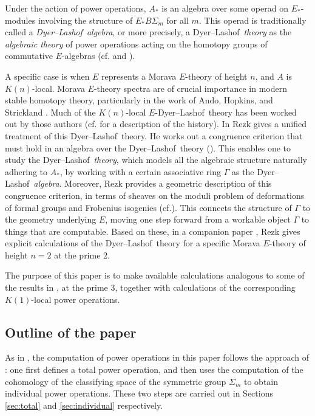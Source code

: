 \documentclass{gtpart}
\theoremstyle{definition}
\theoremstyle{remark}
\newcommand{\cf}{cf.\thinspace}
\newcommand{\DL}{Dyer--Lashof~}
\newcommand{\G}{\Gamma}
\begin{document}
Under the action of power operations, $A_*$ is an algebra over some operad on $E_*$-modules involving the structure of $E_* B\Sigma_m$ for all $m$.  
This operad is traditionally called a {\em \DL algebra}, or more precisely, 
a \DL {\em theory} as the {\em algebraic theory} of power operations acting on the homotopy groups of commutative $E$-algebras 
(\cf \cite[Chapters III, VIII, and IX]{H_infty} and \cite[Section 9]{lpo}).  

A specific case is when $E$ represents a Morava $E$-theory of height $n$, and $A$ is $K(n)$-local.  
Morava $E$-theory spectra are of crucial importance in modern stable homotopy theory, 
particularly in the work of Ando, Hopkins, and Strickland \cite{cube}.  
Much of the $K(n)$-local $E$-\DL theory has been worked out by those authors (\cf \cite[1.5]{cong} for a description of the history).  
In \cite{cong} Rezk gives a unified treatment of this \DL theory.  
He works out a congruence criterion that must hold in an algebra over the \DL theory (\cite[Theorem A]{cong}).  
This enables one to study the \DL {\em theory}, which models all the algebraic structure naturally adhering to $A_*$, 
by working with a certain associative ring $\G$ as the \DL {\em algebra}.  
Moreover, Rezk provides a geometric description of this congruence criterion, 
in terms of sheaves on the moduli problem of deformations of formal groups and Frobenius isogenies (\cf \cite[Theorem B]{cong}).  
This connects the structure of $\G$ to the geometry underlying $E$, 
moving one step forward from a workable object $\G$ to things that are computable.  
Based on these, in a companion paper \cite{h2p2}, 
Rezk gives explicit calculations of the \DL theory for a specific Morava $E$-theory of height $n = 2$ at the prime 2.  

The purpose of this paper is to make available calculations analogous to some of the results in \cite{h2p2}, at the prime 3, 
together with calculations of the corresponding $K(1)$-local power operations.  


\subsection{Outline of the paper}

As in \cite{h2p2}, the computation of power operations in this paper follows the approach of \cite{steenrod}: 
one first defines a total power operation, 
and then uses the computation of the cohomology of the classifying space of the symmetric group $\Sigma_m$ to obtain individual power operations.  
These two steps are carried out in Sections \ref{sec:total} and \ref{sec:individual} respectively.  
\end{document}
